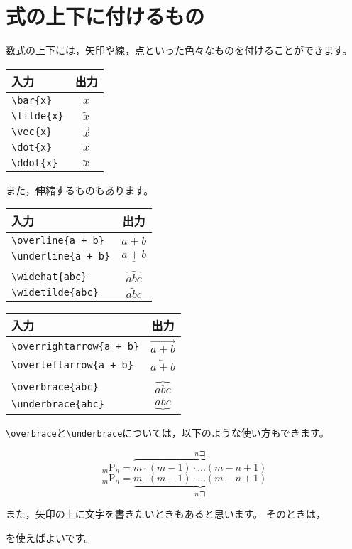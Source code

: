 \section{式の上下に付けるもの}
数式の上下には，矢印や線，点といった色々なものを付けることができます。

\begin{tabular}{lc}
入力 & 出力 \\ \hline
\verb|\bar{x}| & $\bar{x}$ \\
\verb|\tilde{x}| & $\tilde{x}$ \\
\verb|\vec{x}| & $\vec{x}$ \\
\verb|\dot{x}| & $\dot{x}$ \\
\verb|\ddot{x}| & $\ddot{x}$ \\
\end{tabular}

また，伸縮するものもあります。

\begin{tabular}{lc}
入力 & 出力 \\ \hline
\verb|\overline{a + b}| & $\overline{a + b}$ \\
\verb|\underline{a + b}| & $\underline{a + b}$ \\
\\
\verb|\widehat{abc}| & $\widehat{abc}$ \\
\verb|\widetilde{abc}| & $\widetilde{abc}$ \\
\end{tabular}
\begin{tabular}{lc}
入力 & 出力 \\ \hline
\verb|\overrightarrow{a + b}| & $\overrightarrow{a + b}$ \\
\verb|\overleftarrow{a + b}| & $\overleftarrow{a + b}$ \\
\\
\verb|\overbrace{abc}| & $\overbrace{abc}$ \\
\verb|\underbrace{abc}| & $\underbrace{abc}$ \\
\end{tabular}

\verb|\overbrace|と\verb|\underbrace|については，以下のような使い方もできます。

\begin{IOTeX*}
\[
{}_m \mathrm{P}_n = \overbrace{m \cdot (m-1) \cdot \dots (m-n+1)}^{n \text{コ}}
\]
\[
{}_m \mathrm{P}_n = \underbrace{m \cdot (m-1) \cdot \dots (m-n+1)}_{n \text{コ}}
\]
\end{IOTeX*}

また，矢印の上に文字を書きたいときもあると思います。
そのときは，
\begin{ITeX}
\end{ITeX}
を使えばよいです。


